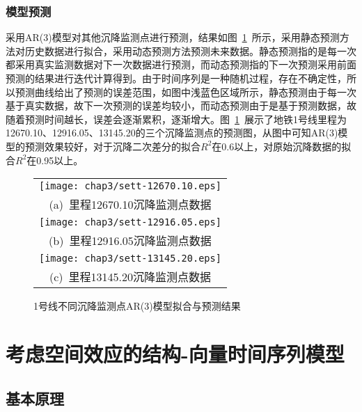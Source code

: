 \subsubsection{模型预测}

采用AR(3)模型对其他沉降监测点进行预测，结果如图~\ref{fig:不同沉降监测点AR3模型拟合与预测结果}~所示，采用静态预测方法对历史数据进行拟合，采用动态预测方法预测未来数据。静态预测指的是每一次都采用真实监测数据对下一次数据进行预测，而动态预测指的下一次预测采用前面预测的结果进行迭代计算得到。由于时间序列是一种随机过程，存在不确定性，所以预测曲线给出了预测的误差范围，如图中浅蓝色区域所示，静态预测由于每一次基于真实数据，故下一次预测的误差均较小，而动态预测由于是基于预测数据，故随着预测时间越长，误差会逐渐累积，逐渐增大。图~\ref{fig:不同沉降监测点AR3模型拟合与预测结果}~展示了地铁1号线里程为 12670.10、12916.05、13145.20的三个沉降监测点的预测图，从图中可知AR(3)模型的预测效果较好，对于沉降二次差分的拟合$R^2$在0.6以上，对原始沉降数据的拟合$R^2$在0.95以上。

\begin{figure}[htbp] 
    \centering 
    \begin{tabular}{c} 
        \texttt{[image: chap3/sett-12670.10.eps]} \\ 
        (a)~里程12670.10沉降监测点数据 \\
        \texttt{[image: chap3/sett-12916.05.eps]} \\ 
        (b)~里程12916.05沉降监测点数据 \\
        \texttt{[image: chap3/sett-13145.20.eps]} \\ 
        (c)~里程13145.20沉降监测点数据 \\
    \end{tabular}
    \caption{1号线不同沉降监测点AR(3)模型拟合与预测结果} 
    \label{fig:不同沉降监测点AR3模型拟合与预测结果} 
\end{figure}

\section{考虑空间效应的结构-向量时间序列模型}

\subsection{基本原理}

